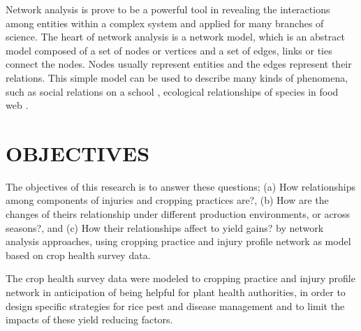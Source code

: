 Network analysis is prove to be a powerful tool in revealing the interactions among entities within a complex system and applied for many branches of science. The heart of network analysis is a network model, which is an abstract model composed of a set of nodes or vertices and a set of edges, links or ties connect the nodes. Nodes usually represent entities and the edges represent their relations. This simple model can be used to describe many kinds of phenomena, such as social relations on a school , ecological relationships of species in food web .

\section*{OBJECTIVES}


The objectives of this research is to answer these questions; (a) How relationships among components of injuries and cropping practices are?, (b) How are the changes of theirs relationship under different production environments, or across seasons?, and (c) How their relationships affect to yield gains? by network analysis approaches, using cropping practice and injury profile network as model based on crop health survey data.


The crop health survey data were modeled to cropping practice and injury profile network in anticipation of being helpful for plant health authorities, in order to design specific strategies for rice pest and disease management and to limit the impacts of these yield reducing factors.  



 

